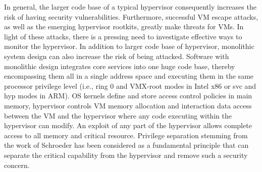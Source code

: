 ﻿\documentclass[conference]{IEEEtran}
\begin{document}
In general, the larger code base of a typical hypervisor consequently increases the risk of having security vulnerabilities.
Furthermore, successful VM escape attacks, as well as the emerging hypervisor rootkits, greatly make threats for VMs.
In light of these attacks, there is a pressing need to investigate effective ways to monitor the hypervisor. 
In addition to larger code base of hypervisor, monolithic system design can also increase the risk of being attacked.
Software with monolithic design integrates core services into one huge code base, thereby encompassing them all in a single address space and executing them in the same processor privilege level (i.e., ring 0 and VMX-root modes in Intel x86 or svc and hyp modes in ARM).
OS kernels define and store access control policies in main memory, hypervisor controls VM memory allocation and interaction data access between the VM and the hypervisor where any code executing within the hypervisor can modify.
An exploit of any part of the hypervisor allows complete access to all memory and critical resource. %
Privilege separation stemming from the work of Schroeder\cite{zhaobudao} has been considered as a fundamental principle that can separate the critical capability from the hypervisor and remove such a security concern.
\end{document}
